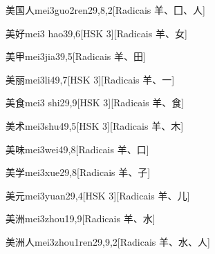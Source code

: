 \begin{entry}{美国人}{mei3guo2ren2}{9,8,2}[Radicais ⽺、⼞、⼈]
\end{entry}

\begin{entry}{美好}{mei3 hao3}{9,6}[HSK 3][Radicais ⽺、⼥]
\end{entry}

\begin{entry}{美甲}{mei3jia3}{9,5}[Radicais ⽺、⽥]
\end{entry}

\begin{entry}{美丽}{mei3li4}{9,7}[HSK 3][Radicais ⽺、⼀]
\end{entry}

\begin{entry}{美食}{mei3 shi2}{9,9}[HSK 3][Radicais ⽺、⾷]
\end{entry}

\begin{entry}{美术}{mei3shu4}{9,5}[HSK 3][Radicais ⽺、⽊]
\end{entry}

\begin{entry}{美味}{mei3wei4}{9,8}[Radicais ⽺、⼝]
\end{entry}

\begin{entry}{美学}{mei3xue2}{9,8}[Radicais ⽺、⼦]
\end{entry}

\begin{entry}{美元}{mei3yuan2}{9,4}[HSK 3][Radicais ⽺、⼉]
\end{entry}

\begin{entry}{美洲}{mei3zhou1}{9,9}[Radicais ⽺、⽔]
\end{entry}

\begin{entry}{美洲人}{mei3zhou1ren2}{9,9,2}[Radicais ⽺、⽔、⼈]
\end{entry}


